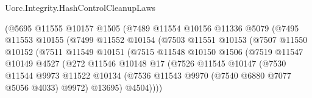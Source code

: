 \begin{lexlean}{Uorc.Integrity.HashControlCleanupLaws}
\begin{coremodule}
                              (@5695
                                @11555
                                @10157
                                @1505
                                (@7489
                                  @11554
                                  @10156
                                  @11336
                                  @5079
                                  (@7495
                                    @11553
                                    @10155
                                    (@7499
                                      @11552
                                      @10154
                                      (@7503
                                        @11551
                                        @10153
                                        (@7507
                                          @11550
                                          @10152
                                          (@7511
                                            @11549
                                            @10151
                                            (@7515
                                              @11548
                                              @10150
                                              @1506
                                              (@7519
                                                @11547
                                                @10149
                                                @4527
                                                (@272
                                                  @11546
                                                  @10148
                                                  @17
                                                  (@7526
                                                    @11545
                                                    @10147
                                                    (@7530
                                                      @11544
                                                      @9973
                                                      @11522
                                                      @10134
                                                      (@7536
                                                        @11543
                                                        @9970
                                                        (@7540 @6880 @7077 @5056 @4033)
                                                        @9972)
                                                      @13695)
                                                    @4504))))

\end{coremodule}
\end{lexlean}
